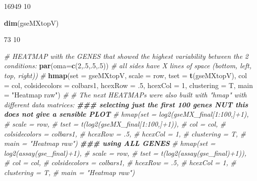\documentclass[
]{article}
\newenvironment{Shaded}{\begin{snugshade}}{\end{snugshade}}
\newcommand{\AttributeTok}[1]{\textcolor[rgb]{0.13,0.29,0.53}{#1}}
\newcommand{\CommentTok}[1]{\textcolor[rgb]{0.56,0.35,0.01}{\textit{#1}}}
\newcommand{\DecValTok}[1]{\textcolor[rgb]{0.00,0.00,0.81}{#1}}
\newcommand{\DocumentationTok}[1]{\textcolor[rgb]{0.56,0.35,0.01}{\textbf{\textit{#1}}}}
\newcommand{\FunctionTok}[1]{\textcolor[rgb]{0.13,0.29,0.53}{\textbf{#1}}}
\newcommand{\NormalTok}[1]{#1}
\newcommand{\StringTok}[1]{\textcolor[rgb]{0.31,0.60,0.02}{#1}}
\begin{document}
\begin{Shaded}
\begin{Highlighting}[]
\NormalTok{[1] 16949    10}
\end{Highlighting}
\end{Shaded}

\begin{Shaded}
\begin{Highlighting}[]
\FunctionTok{dim}\NormalTok{(gseMXtopV)}
\end{Highlighting}
\end{Shaded}

\begin{Shaded}
\begin{Highlighting}[]
\NormalTok{[1] 73 10}
\end{Highlighting}
\end{Shaded}

\begin{Shaded}
\begin{Highlighting}[]
\CommentTok{\# HEATMAP with the GENES that showed the highest variability between the 2 conditions:}
\FunctionTok{par}\NormalTok{(}\AttributeTok{oma=}\FunctionTok{c}\NormalTok{(}\DecValTok{2}\NormalTok{,.}\DecValTok{5}\NormalTok{,.}\DecValTok{5}\NormalTok{,.}\DecValTok{5}\NormalTok{)) }\CommentTok{\# all sides have X lines of space (bottom, left, top, right)) }
\CommentTok{\#}
\FunctionTok{hmap}\NormalTok{(}\AttributeTok{set =}\NormalTok{ gseMXtopV,}
     \AttributeTok{scale =} \StringTok{\textquotesingle{}row\textquotesingle{}}\NormalTok{,}
     \AttributeTok{tset =} \FunctionTok{t}\NormalTok{(gseMXtopV),}
     \AttributeTok{col =}\NormalTok{ col,}
     \AttributeTok{colsidecolors =}\NormalTok{ colbars1,}
     \AttributeTok{hcexRow =}\NormalTok{ .}\DecValTok{5}\NormalTok{,}
     \AttributeTok{hcexCol =} \DecValTok{1}\NormalTok{,}
     \AttributeTok{clustering =}\NormalTok{ T,}
     \AttributeTok{main =} \StringTok{"Heatmap raw"}\NormalTok{)}
\CommentTok{\# }
\CommentTok{\# The next HEATMAPs were also built with "hmap" with different data matrices: }
\DocumentationTok{\#\#\# selecting just the first 100 genes NUT this does not give a sensible PLOT}
\CommentTok{\# hmap(set = log2(gseMX\_final[1:100,]+1),}
\CommentTok{\#      scale = \textquotesingle{}row\textquotesingle{},}
\CommentTok{\#      tset = t(log2(gseMX\_final[1:100,]+1)),}
\CommentTok{\#      col = col,}
\CommentTok{\#      colsidecolors = colbars1,}
\CommentTok{\#      hcexRow = .5,}
\CommentTok{\#      hcexCol = 1,}
\CommentTok{\#      clustering = T,}
\CommentTok{\#      main = "Heatmap raw")}
\DocumentationTok{\#\#\# using ALL GENES }
\CommentTok{\# hmap(set = log2(assay(gse\_final)+1),}
\CommentTok{\#      scale = \textquotesingle{}row\textquotesingle{},}
\CommentTok{\#      tset = t(log2(assay(gse\_final)+1)),}
\CommentTok{\#      col = col,}
\CommentTok{\#      colsidecolors = colbars1,}
\CommentTok{\#      hcexRow = .5,}
\CommentTok{\#      hcexCol = 1,}
\CommentTok{\#      clustering = T,}
\CommentTok{\#      main = "Heatmap raw")}
\end{Highlighting}
\end{Shaded}
\end{document}
